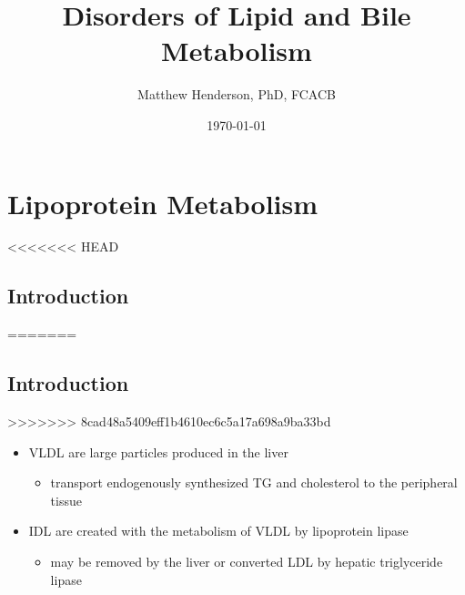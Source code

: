 \documentclass{scrartcl}
\author{Matthew Henderson, PhD, FCACB}
\date{\today}
\title{Disorders of Lipid and Bile Metabolism}
\begin{document}
\maketitle
\tableofcontents


\section{Lipoprotein Metabolism}
<<<<<<< HEAD
\label{sec:orgab6195c}
\subsection{Introduction}
\label{sec:orgd020610}
=======
\label{sec:org2e5b872}
\subsection{Introduction}
\label{sec:org4554180}
>>>>>>> 8cad48a5409eff1b4610ec6c5a17a698a9ba33bd
\begin{itemize}
\item VLDL are large particles produced in the liver
\begin{itemize}
\item transport endogenously synthesized TG and cholesterol to the peripheral tissue
\end{itemize}
\item IDL are created with the metabolism of VLDL by lipoprotein lipase
\begin{itemize}
\item may be removed by the liver or converted LDL by hepatic triglyceride lipase
\end{itemize}
\end{itemize}
\end{document}
